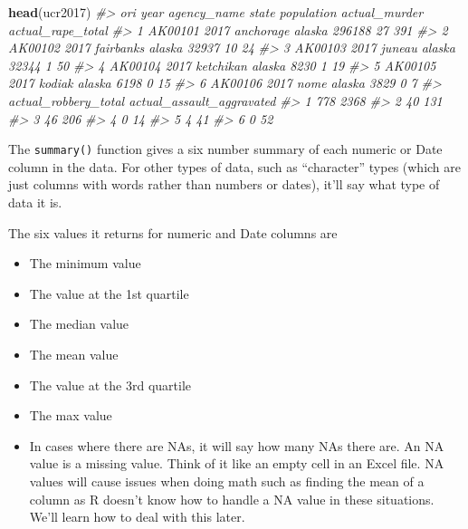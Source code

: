 \documentclass[
  12pt,
]{book}
\newenvironment{Shaded}{\begin{snugshade}}{\end{snugshade}}
\newcommand{\CommentTok}[1]{\textcolor[rgb]{0.56,0.35,0.01}{\textit{#1}}}
\newcommand{\KeywordTok}[1]{\textcolor[rgb]{0.13,0.29,0.53}{\textbf{#1}}}
\newcommand{\NormalTok}[1]{#1}
\providecommand{\tightlist}{%
  \setlength{\itemsep}{0pt}\setlength{\parskip}{0pt}}
\begin{document}
\begin{Shaded}
\begin{Highlighting}[]
\KeywordTok{head}\NormalTok{(ucr2017)}
\CommentTok{\#>       ori year agency\_name  state population actual\_murder actual\_rape\_total}
\CommentTok{\#> 1 AK00101 2017   anchorage alaska     296188            27               391}
\CommentTok{\#> 2 AK00102 2017   fairbanks alaska      32937            10                24}
\CommentTok{\#> 3 AK00103 2017      juneau alaska      32344             1                50}
\CommentTok{\#> 4 AK00104 2017   ketchikan alaska       8230             1                19}
\CommentTok{\#> 5 AK00105 2017      kodiak alaska       6198             0                15}
\CommentTok{\#> 6 AK00106 2017        nome alaska       3829             0                 7}
\CommentTok{\#>   actual\_robbery\_total actual\_assault\_aggravated}
\CommentTok{\#> 1                  778                      2368}
\CommentTok{\#> 2                   40                       131}
\CommentTok{\#> 3                   46                       206}
\CommentTok{\#> 4                    0                        14}
\CommentTok{\#> 5                    4                        41}
\CommentTok{\#> 6                    0                        52}
\end{Highlighting}
\end{Shaded}

The \texttt{summary()} function gives a six number summary of each numeric or Date column in the data. For other types of data, such as ``character'' types (which are just columns with words rather than numbers or dates), it'll say what type of data it is.

The six values it returns for numeric and Date columns are

\begin{itemize}
\tightlist
\item
  The minimum value
\item
  The value at the 1st quartile
\item
  The median value
\item
  The mean value
\item
  The value at the 3rd quartile
\item
  The max value
\item
  In cases where there are NAs, it will say how many NAs there are. An NA value is a missing value. Think of it like an empty cell in an Excel file. NA values will cause issues when doing math such as finding the mean of a column as R doesn't know how to handle a NA value in these situations. We'll learn how to deal with this later.
\end{itemize}
\end{document}

